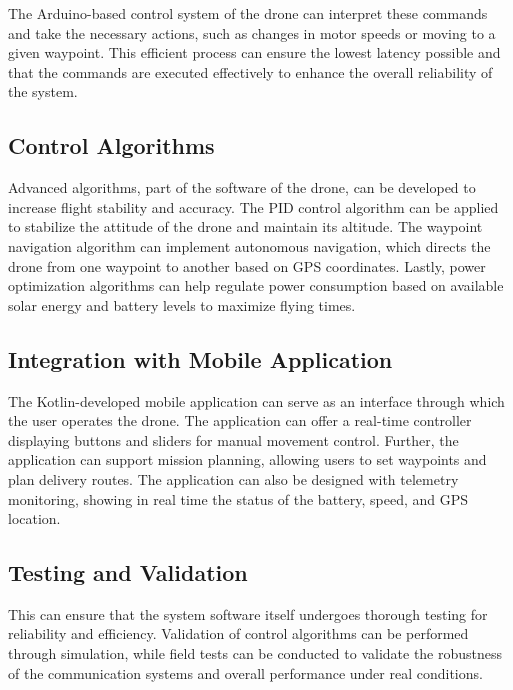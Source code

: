 The Arduino-based control system of the drone can interpret these commands and take the necessary actions, such as changes in motor speeds or moving to a given waypoint. This efficient process can ensure the lowest latency possible and that the commands are executed effectively to enhance the overall reliability of the system.

\subsection{Control Algorithms} 
Advanced algorithms, part of the software of the drone, can be developed to increase flight stability and accuracy. The PID control algorithm can be applied to stabilize the attitude of the drone and maintain its altitude. The waypoint navigation algorithm can implement autonomous navigation, which directs the drone from one waypoint to another based on GPS coordinates. Lastly, power optimization algorithms can help regulate power consumption based on available solar energy and battery levels to maximize flying times. 

\subsection{Integration with Mobile Application} 
The Kotlin-developed mobile application can serve as an interface through which the user operates the drone. The application can offer a real-time controller displaying buttons and sliders for manual movement control. Further, the application can support mission planning, allowing users to set waypoints and plan delivery routes. The application can also be designed with telemetry monitoring, showing in real time the status of the battery, speed, and GPS location. 

\subsection{Testing and Validation} 
This can ensure that the system software itself undergoes thorough testing for reliability and efficiency. Validation of control algorithms can be performed through simulation, while field tests can be conducted to validate the robustness of the communication systems and overall performance under real conditions.